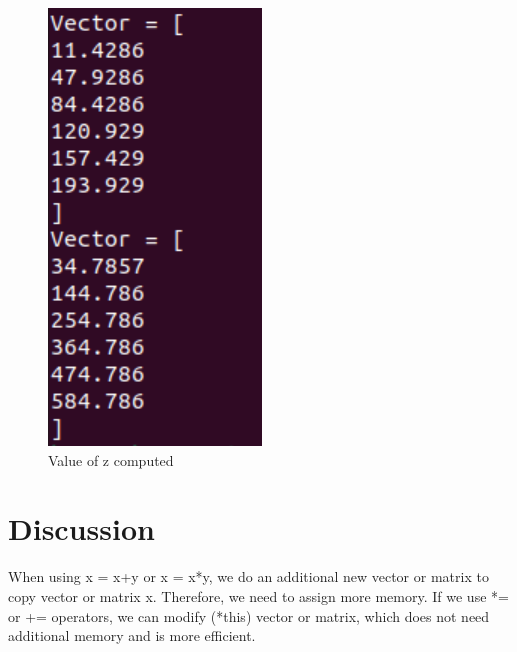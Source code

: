 \documentclass[10pt,a4paper]{article}
\begin{document}
\begin{figure}[!ht]
        \centering \includegraphics[scale=1]{figures/output2.png}
        \caption{Value of z computed}
\end{figure}

\section{Discussion}

When using x = x+y or x = x*y, we do an additional new vector or matrix to copy vector or matrix x. Therefore, we need to assign more memory. If we use *= or += operators, we can modify (*this) vector or matrix, which does not need additional memory and is more efficient. 
\end{document}
